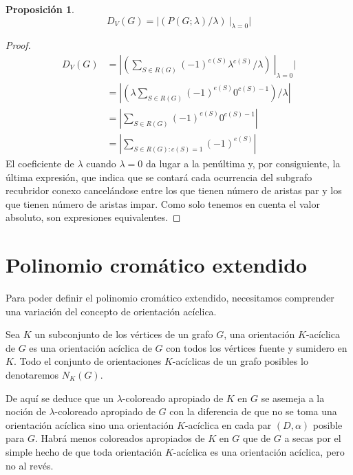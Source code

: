\documentclass{article}
\newtheorem{proposition}{Proposición}[section]
\numberwithin{figure}{section}
\begin{document}
\begin{proposition}
    \begin{equation*}
        D_V(G) = |(P(G; \lambda)/\lambda)\ |_{\lambda=0}|
    \end{equation*}
\end{proposition}
\begin{proof}
    \begin{equation*}
        \begin{split}
            D_V(G) &= |(\sum_{S \in R(G)} (-1)^{e(S)} \lambda^{c(S)}/\lambda)\ |_{\lambda=0}|
                   \\
                   &= |(\lambda \sum_{S \in R(G)} (-1)^{e(S)} 0^{c(S)-1})/\lambda|
                   \\
                   &= |\sum_{S \in R(G)} (-1)^{e(S)} 0^{c(S)-1}|
                   \\
                   &= |\sum_{S \in R(G) : c(S) = 1} (-1)^{e(S)}|
        \end{split}
    \end{equation*}
    El coeficiente de $\lambda$ cuando $\lambda = 0$ da lugar a la penúltima y, por consiguiente, la última expresión, que indica que se contará cada ocurrencia del subgrafo recubridor conexo cancelándose entre los que tienen número de aristas par y los que tienen número de aristas impar. Como solo tenemos en cuenta el valor absoluto, son expresiones equivalentes.
\end{proof}

\section{Polinomio cromático extendido}

Para poder definir el polinomio cromático extendido, necesitamos comprender una variación del concepto de orientación acíclica.

Sea $K$ un subconjunto de los vértices de un grafo $G$, una orientación $K$-acíclica de $G$ es una orientación acíclica de $G$ con todos los vértices fuente y sumidero en $K$. Todo el conjunto de orientaciones $K$-acíclicas de un grafo posibles lo denotaremos $N_K(G)$.

De aquí se deduce que un $\lambda$-coloreado apropiado de $K$ en $G$ se asemeja a la noción de $\lambda$-coloreado apropiado de $G$ con la diferencia de que no se toma una orientación acíclica sino una orientación $K$-acíclica en cada par $(D, \alpha)$ posible para $G$. Habrá menos coloreados apropiados de $K$ en $G$ que de $G$ a secas por el simple hecho de que toda orientación $K$-acíclica es una orientación acíclica, pero no al revés.
\end{document}
